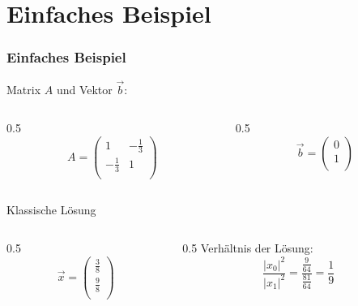 \section{Einfaches Beispiel}

\begin{frame}
    \frametitle{Einfaches Beispiel}

    Matrix $A$ und Vektor $\vec{b}$:
    \begin{columns}[c]
        \begin{column}{0.5\hsize}\centering
            $$A = \begin{pmatrix} 1 & -\frac{1}{3}\\ -\frac{1}{3} & 1\\ \end{pmatrix}$$
        \end{column}

        \begin{column}{0.5\hsize}
            $$\vec{b} = \begin{pmatrix} 0 \\ 1\\ \end{pmatrix}$$
        \end{column}
    \end{columns}
 
    \hfil

    \hfil

    Klassische Lösung
    \begin{columns}[c]
        \begin{column}{0.5\hsize}
            \centering
            $$\vec{x} = \begin{pmatrix} \frac{3}{8}\\ \frac{9}{8}\\ \end{pmatrix}$$
        \end{column}

        \begin{column}{0.5\hsize}
            \centering
            Verhältnis der Lösung:
            $$\frac{ |x_0|^2}{ |x_1|^2}= \frac{\frac{9}{64}}{\frac{81}{64}} = \frac{1}{9}$$
        \end{column}
    \end{columns}
 
    \hfil

    \hfil

\end{frame}

